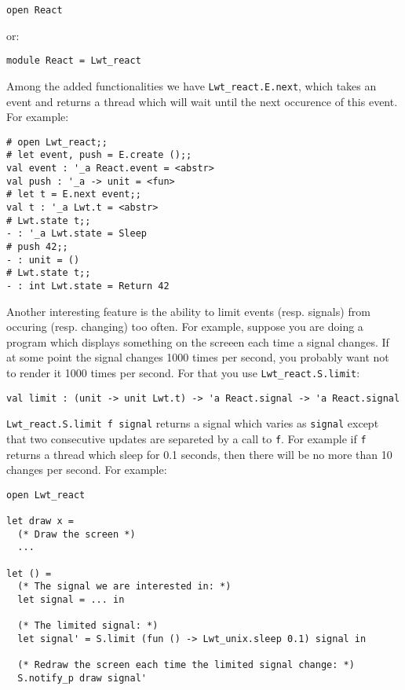 \lstset{language=[Objective]Caml}\begin{lstlisting}
open React
\end{lstlisting}
\medskip

\noindent
or:



\lstset{language=[Objective]Caml}\begin{lstlisting}
module React = Lwt_react
\end{lstlisting}
\medskip

\noindent
Among the added functionalities we have {\tt Lwt\_react.E.next}, which
takes an event and returns a thread which will wait until the next
occurence of this event. For example:



\lstset{language=[Objective]Caml}\begin{lstlisting}
# open Lwt_react;;
# let event, push = E.create ();;
val event : '_a React.event = <abstr>
val push : '_a -> unit = <fun>
# let t = E.next event;;
val t : '_a Lwt.t = <abstr>
# Lwt.state t;;
- : '_a Lwt.state = Sleep
# push 42;;
- : unit = ()
# Lwt.state t;;
- : int Lwt.state = Return 42
\end{lstlisting}
\medskip

\noindent
Another interesting feature is the ability to limit events
(resp. signals) from occuring (resp. changing) too often. For example,
suppose you are doing a program which displays something on the screeen
each time a signal changes. If at some point the signal changes 1000
times per second, you probably want not to render it 1000 times per
second. For that you use {\tt Lwt\_react.S.limit}:



\lstset{language=[Objective]Caml}\begin{lstlisting}
val limit : (unit -> unit Lwt.t) -> 'a React.signal -> 'a React.signal
\end{lstlisting}
\medskip

\noindent
{\tt Lwt\_react.S.limit f signal} returns a signal which varies as
{\tt signal} except that two consecutive updates are separeted by a
call to {\tt f}. For example if {\tt f} returns a thread which sleep
for 0.1 seconds, then there will be no more than 10 changes per
second. For example:



\lstset{language=[Objective]Caml}\begin{lstlisting}
open Lwt_react

let draw x =
  (* Draw the screen *)
  ...

let () =
  (* The signal we are interested in: *)
  let signal = ... in

  (* The limited signal: *)
  let signal' = S.limit (fun () -> Lwt_unix.sleep 0.1) signal in

  (* Redraw the screen each time the limited signal change: *)
  S.notify_p draw signal'
\end{lstlisting}
\medskip

